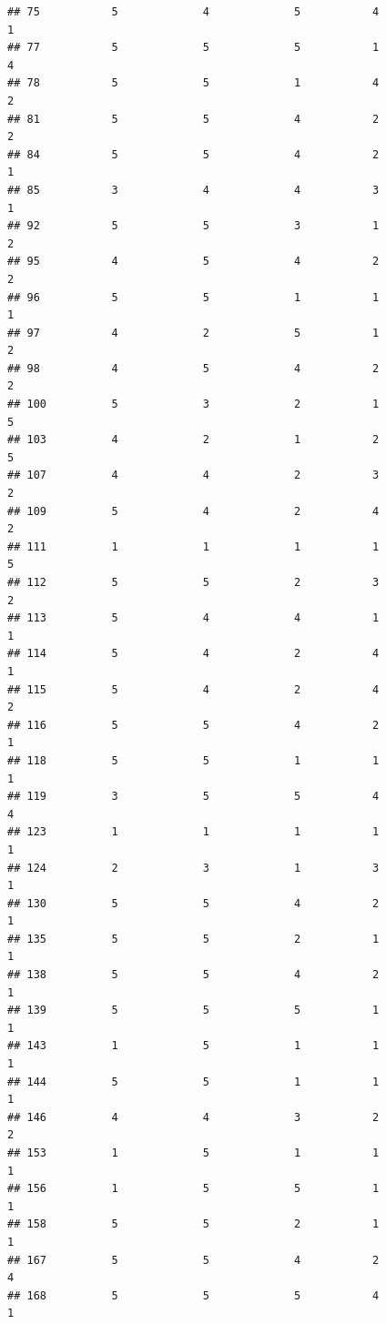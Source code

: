 \documentclass[
]{article}
\begin{document}
\begin{verbatim}
## 75           5             4             5           4             1
## 77           5             5             5           1             4
## 78           5             5             1           4             2
## 81           5             5             4           2             2
## 84           5             5             4           2             1
## 85           3             4             4           3             1
## 92           5             5             3           1             2
## 95           4             5             4           2             2
## 96           5             5             1           1             1
## 97           4             2             5           1             2
## 98           4             5             4           2             2
## 100          5             3             2           1             5
## 103          4             2             1           2             5
## 107          4             4             2           3             2
## 109          5             4             2           4             2
## 111          1             1             1           1             5
## 112          5             5             2           3             2
## 113          5             4             4           1             1
## 114          5             4             2           4             1
## 115          5             4             2           4             2
## 116          5             5             4           2             1
## 118          5             5             1           1             1
## 119          3             5             5           4             4
## 123          1             1             1           1             1
## 124          2             3             1           3             1
## 130          5             5             4           2             1
## 135          5             5             2           1             1
## 138          5             5             4           2             1
## 139          5             5             5           1             1
## 143          1             5             1           1             1
## 144          5             5             1           1             1
## 146          4             4             3           2             2
## 153          1             5             1           1             1
## 156          1             5             5           1             1
## 158          5             5             2           1             1
## 167          5             5             4           2             4
## 168          5             5             5           4             1

\end{verbatim}
\end{document}
